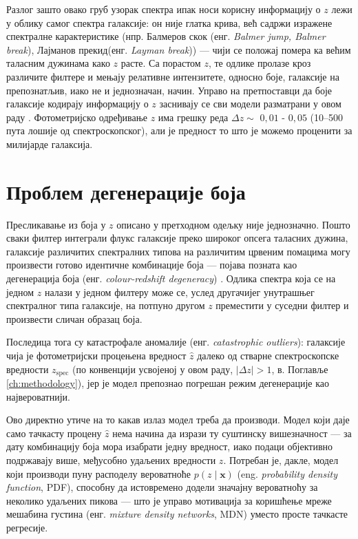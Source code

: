 \documentclass[12pt,oneside]{memoir}
\begin{document}
Разлог зашто овако груб узорак спектра ипак носи корисну информацију о $z$
лежи у облику самог спектра галаксије: он није глатка крива, већ садржи
изражене спектралне карактеристике (нпр. Балмеров скок (енг. \textit{Balmer jump, Balmer break}), Лајманов прекид(енг. \textit{Layman break})) — чији се положај помера ка већим таласним дужинама како
$z$ расте. Са порастом $z$, те одлике пролазе кроз различите филтере и
мењају релативне интензитете, односно боје, галаксије на препознатљив, иако
не и једнозначан, начин. Управо на претпоставци да боје галаксије кодирају
информацију о $z$ заснивају се сви модели разматрани у овом раду \cite{fernandezsoto2001redshift}.
Фотометријско одређивање $z$ има грешку реда $\Delta z \sim$  $0{,}01$ - $0{,}05$  (10–500 пута лошије од спектроскопског), али је
предност то што је можемо проценити за милијарде галаксија.

\section{Проблем дегенерације боја}
\label{sec:degeneracija}

Пресликавање из боја у $z$ описано у претходном одељку није једнозначно.
Пошто сваки филтер интеграли флукс галаксије преко широког опсега таласних
дужина, галаксије различитих спектралних типова на различитим црвеним помацима
могу произвести готово идентичне комбинације боја — појава позната као
дегенерација боја (енг. \textit{colour-redshift degeneracy}) \cite{cagliari2022euclid}. Одлика спектра која се
на једном $z$ налази у једном филтеру може се, услед другачијег унутрашњег
спектралног типа галаксије, на потпуно другом $z$ преместити у суседни
филтер и произвести сличан образац боја.

Последица тога су катастрофале аномалије (енг. \textit{catastrophic outliers}): 
галаксије чија је фотометријски
процењена вредност $\hat z$ далеко од стварне спектроскопске вредности
$z_{\mathrm{spec}}$ (по конвенцији усвојеној у овом раду, $|\Delta z| > 1$,
в. Поглавље \ref{ch:methodology}), јер је модел препознао погрешан режим дегенерације као
највероватнији.

Ово директно утиче на то какав излаз модел треба да производи. Модел који
даје само тачкасту процену $\hat z$ нема начина да изрази ту суштинску
вишезначност — за дату комбинацију боја мора изабрати једну вредност, иако
подаци објективно подржавају више, међусобно удаљених вредности $z$.
Потребан је, дакле, модел који производи пуну расподелу вероватноће $p(z
\mid \mathbf{x})$ (eng. \textit{probability density function}, PDF), 
способну да истовремено додели значајну вероватноћу за
неколико удаљених пикова — што је управо мотивација за коришћење
мреже мешабина густина (енг. \textit{mixture density networks}, MDN) уместо
просте тачкасте регресије.
\end{document}
